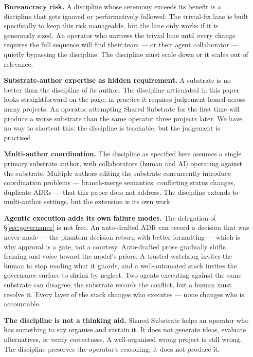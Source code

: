 \documentclass[11pt,a4paper,twocolumn]{article}
\begin{document}
\textbf{Bureaucracy risk.} A discipline whose ceremony exceeds its
benefit is a discipline that gets ignored or performatively
followed. The trivial-fix lane is built specifically to keep this
risk manageable, but the lane only works if it is generously sized.
An operator who narrows the trivial lane until every change
requires the full sequence will find their team --- or their agent
collaborator --- quietly bypassing the discipline. The discipline
must scale down or it scales out of relevance.

\textbf{Substrate-author expertise as hidden requirement.} A
substrate is no better than the discipline of its author. The
discipline articulated in this paper looks straightforward on the
page; in practice it requires judgement honed across many projects.
An operator attempting Shared Substrate for the first time
will produce a worse substrate than the same operator three
projects later. We have no way to shortcut this: the discipline is
teachable, but the judgement is practised.

\textbf{Multi-author coordination.} The discipline as specified
here assumes a single primary substrate author, with collaborators
(human and AI) operating against the substrate. Multiple authors
editing the substrate concurrently introduce coordination problems
--- branch-merge semantics, conflicting status changes, duplicate
ADRs --- that this paper does not address. The discipline extends
to multi-author settings, but the extension is its own work.

\textbf{Agentic execution adds its own failure modes.} The
delegation of \S\ref{sec:governance} is not free. An auto-drafted
ADR can record a decision that was never made --- the phantom
decision reborn with better formatting --- which is why approval
is a gate, not a courtesy. Auto-drafted prose gradually shifts
framing and voice toward the model's priors. A trusted watchdog
invites the human to stop reading what it guards, and a
well-automated stack invites the governance surface to shrink by
neglect. Two agents executing against the same substrate can
disagree; the substrate records the conflict, but a human must
resolve it. Every layer of the stack changes who executes ---
none changes who is accountable.

\textbf{The discipline is not a thinking aid.} Shared
Substrate helps an operator who has something to say organise
and sustain it. It does not generate ideas, evaluate alternatives,
or verify correctness. A well-organised wrong project is still
wrong. The discipline preserves the operator's reasoning; it
does not produce it.
\end{document}
